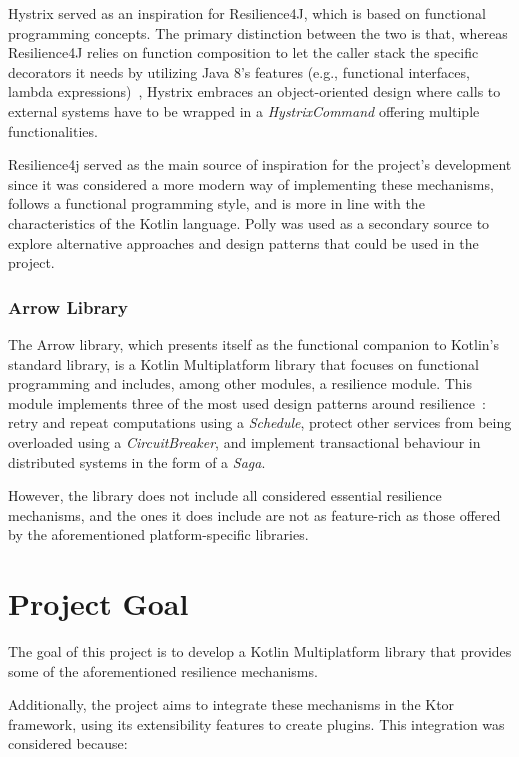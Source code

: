 Hystrix served as an inspiration for Resilience4J, which is based on functional programming concepts.
The primary distinction between the two is that, whereas Resilience4J relies on function composition to let the caller stack the specific decorators it needs by utilizing Java 8's features (e.g., functional interfaces, lambda expressions)~\cite{resilience4j-vs-hystrix}, Hystrix embraces an object-oriented design where calls to external systems have to be wrapped in a \textit{HystrixCommand} offering multiple functionalities.

Resilience4j served as the main source of inspiration for the project's development since it was considered a more modern way of implementing these mechanisms, follows a functional programming style, and is more in line with the characteristics of the Kotlin language.
Polly was used as a secondary source to explore alternative approaches and design patterns that could be used in the project.

\subsubsection{Arrow Library}

The Arrow library,
which presents itself as the functional companion to Kotlin's standard library, is a Kotlin Multiplatform library that
focuses on functional programming and includes, among other modules, a resilience module.
This module implements three of the most used design patterns around resilience~\cite{arrow-resilience}:
retry and repeat computations using a \textit{Schedule},
protect other services from being overloaded using a \textit{CircuitBreaker},
and implement transactional behaviour in distributed systems in the form of a \textit{Saga}.

However, the library does not include all considered essential resilience mechanisms, and the ones it does include are
not as feature-rich as those offered by the aforementioned platform-specific libraries.


\section{Project Goal}\label{sec:project-goal}

The goal of this project is
to develop a Kotlin Multiplatform library that provides some of the aforementioned resilience mechanisms.

Additionally, the project aims to integrate these mechanisms in the Ktor framework, using its extensibility features to create plugins.
This integration was considered because:

